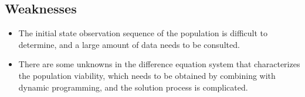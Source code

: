 \documentclass[12pt]{article}  %
\begin{document}
\subsection{Weaknesses}
\begin{itemize}
    \item The initial state observation sequence of the population is difficult to determine, and a large amount of data needs to be consulted.
    
    \item There are some unknowns in the difference equation system that characterizes the population viability, which needs to be obtained by combining with dynamic programming, and the solution process is complicated.
 \end{itemize}

\end{document}
